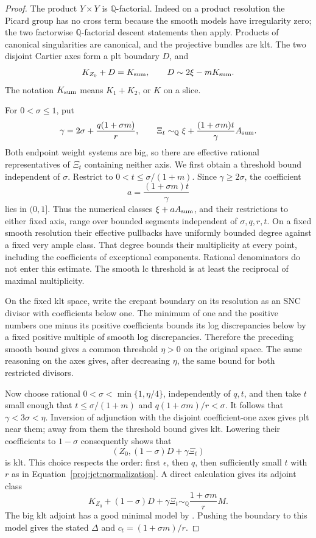 \documentclass[11pt,letterpaper]{article}
\theoremstyle{definition}
\theoremstyle{remark}
\begin{document}
\begin{proof}
The product \(Y\times Y\) is \(\mathbb{Q}\)-factorial.  Indeed on a product
resolution the Picard group has no cross term because the smooth
models have irregularity zero; the two factorwise
\(\mathbb{Q}\)-factorial descent statements then apply.  Products of
canonical singularities are canonical, and the projective bundles
are klt.  The two disjoint Cartier axes form a plt boundary \(D\),
and
\[
 K_{Z_0}+D=K_{\rm sum},\qquad
 D\sim2\xi-mK_{\rm sum}.
\]
The notation \(K_{\rm sum}\) means \(K_1+K_2\), or \(K\) on a slice.

For \(0<\sigma\le1\), put
\[
 \gamma=2\sigma+\frac{q(1+\sigma m)}r,\qquad
 \Xi_t\sim_{\mathbb{Q}}\xi+
       \frac{(1+\sigma m)t}{\gamma}A_{\rm sum}.
\]
Both endpoint weight systems are big, so there are effective
rational representatives of \(\Xi_t\) containing neither axis.
We first obtain a threshold bound independent of \(\sigma\).
Restrict to \(0<t\le\sigma/(1+m)\).  Since \(\gamma\ge2\sigma\),
the coefficient
\[
 a=\frac{(1+\sigma m)t}{\gamma}
\]
lies in \((0,1]\).  Thus the numerical classes
\(\xi+aA_{\rm sum}\), and their restrictions to either fixed axis,
range over bounded segments independent of \(\sigma,q,r,t\).
On a fixed smooth resolution their effective pullbacks have
uniformly bounded degree against a fixed very ample class.
That degree bounds their multiplicity at every point, including
the coefficients of exceptional components.  Rational denominators
do not enter this estimate.  The smooth lc threshold is at least
the reciprocal of maximal multiplicity.

On the fixed klt space, write the crepant boundary on its resolution
as an SNC divisor with coefficients below one.  The minimum of
one and the positive numbers one minus its positive coefficients
bounds its log discrepancies below by a fixed positive multiple
of smooth log discrepancies.  Therefore the preceding smooth
bound gives a common threshold \(\eta>0\) on the original space.
The same reasoning on the axes gives, after decreasing \(\eta\),
the same bound for both restricted divisors.

Now choose rational \(0<\sigma<\min\{1,\eta/4\}\), independently of
\(q,t\), and then take \(t\) small enough that
\(t\le\sigma/(1+m)\) and \(q(1+\sigma m)/r<\sigma\).
It follows that \(\gamma<3\sigma<\eta\).
Inversion of adjunction with the disjoint coefficient-one axes
gives plt near them; away from them the threshold bound gives klt.
Lowering their coefficients to \(1-\sigma\) consequently shows that
\[
 (Z_0,(1-\sigma)D+\gamma\Xi_t)
\]
is klt.  This choice respects the order: first \(\epsilon\), then
\(q\), then sufficiently small \(t\) with \(r\) as in
Equation~\eqref{proj:jet:normalization}.
A direct calculation gives its adjoint class
\[
 K_{Z_0}+(1-\sigma)D+\gamma\Xi_t
   \sim_{\mathbb{Q}}\frac{1+\sigma m}{r}M.
\]
The big klt adjoint has a good minimal model by
\cite{BCHM}.  Pushing the boundary to this model gives the stated
\(\Delta\) and \(c_t=(1+\sigma m)/r\).


\end{proof}
\end{document}
